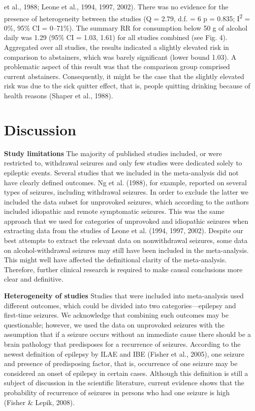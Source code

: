 \documentclass{article}
\begin{document}
et al., 1988; Leone et al., 1994, 1997, 2002). There was no
evidence for the presence of heterogeneity between the
studies (Q = 2.79, d.f. = 6 p = 0.835; I\textsuperscript{2} = 0\%, 95\% CI =
0–71\%). The summary RR for consumption below 50 g of
alcohol daily was 1.29 (95\% CI = 1.03, 1.61) for all studies
combined (see Fig. 4).
Aggregated over all studies, the results indicated a
slightly elevated risk in comparison to abstainers, which
was barely significant (lower bound 1.03). A problematic
aspect of this result was that the comparison group comprised current abstainers. Consequently, it might be the case
that the slightly elevated risk was due to the sick quitter
effect, that is, people quitting drinking because of health
reasons (Shaper et al., 1988).

\section{Discussion}

\textbf{Study limitations}
The majority of published studies included, or were
restricted to, withdrawal seizures and only few studies were
dedicated solely to epileptic events. Several studies that we
included in the meta-analysis did not have clearly defined
outcomes. Ng et al. (1988), for example, reported on several
types of seizures, including withdrawal seizures. In order to
exclude the latter we included the data subset for unprovoked seizures, which according to the authors included idiopathic and remote symptomatic seizures. This was the
same approach that we used for categories of unprovoked
and idiopathic seizures when extracting data from the studies of Leone et al. (1994, 1997, 2002). Despite our best
attempts to extract the relevant data on nonwithdrawal seizures, some data on alcohol-withdrawal seizures may still
have been included in the meta-analysis. This might well
have affected the definitional clarity of the meta-analysis.
Therefore, further clinical research is required to make causal conclusions more clear and definitive.

\textbf{Heterogeneity of studies}
Studies that were included into meta-analysis used different outcomes, which could be divided into two categories—epilepsy and first-time seizures. We acknowledge that
combining such outcomes may be questionable; however,
we used the data on unprovoked seizures with the assumption that if a seizure occurs without an immediate cause
there should be a brain pathology that predisposes for a
recurrence of seizures. According to the newest definition
of epilepsy by ILAE and IBE (Fisher et al., 2005), one seizure and presence of predisposing factor, that is, occurrence
of one seizure may be considered an onset of epilepsy in certain cases. Although this definition is still a subject of discussion in the scientific literature, current evidence shows
that the probability of recurrence of seizures in persons who
had one seizure is high (Fisher \& Lepik, 2008).
\end{document}
